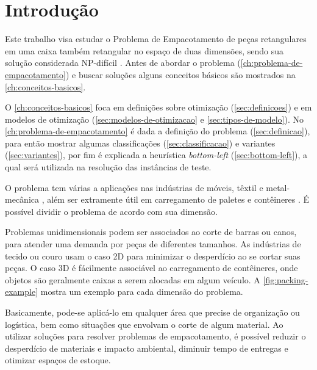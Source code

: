 \chapter*[Introdução]{Introdução}\label{ch:introducao}

Este trabalho visa estudar o Problema de Empacotamento de peças retangulares em uma caixa também retangular no espaço de duas dimensões, sendo sua solução considerada NP-difícil \cite{2DPackLib}.
Antes de abordar o problema (\autoref{ch:problema-de-empacotamento}) e buscar soluções alguns conceitos básicos são mostrados na \autoref{ch:conceitos-basicos}.

O \autoref{ch:conceitos-basicos} foca em definições sobre otimização (\autoref{sec:definicoes}) e em modelos de otimização (\autoref{sec:modelos-de-otimizacao} e \autoref{sec:tipos-de-modelo}).
No \autoref{ch:problema-de-empacotamento} é dada a definição do problema (\autoref{sec:definicao}), para então mostrar algumas classificações (\autoref{sec:classificacao}) e variantes (\autoref{sec:variantes}), por fim é explicada a heurística \textit{bottom-left} (\autoref{sec:bottom-left}), a qual será utilizada na resolução das instâncias de teste.

O problema tem várias a aplicações nas indústrias de móveis, têxtil e metal-mecânica \cite{queiroz2022estudo, cavali2004problemas, belluzzo2005otimizacao}, além ser extramente útil em carregamento de paletes e contêineres \cite{morabito1992abordagem}.
É possível dividir o problema de acordo com sua dimensão.

Problemas unidimensionais podem ser associados ao corte de barras ou canos, para atender uma demanda por peças de diferentes tamanhos.
As indústrias de tecido ou couro usam o caso 2D para minimizar o desperdício ao se cortar suas peças.
O caso 3D é fácilmente associável ao carregamento de contêineres, onde objetos são geralmente caixas a serem alocadas em algum veículo.
A \autoref{fig:packing-example} mostra um exemplo para cada dimensão do problema.



Basicamente, pode-se aplicá-lo em qualquer área que precise de organização ou logística, bem como situações que envolvam o corte de algum material.
Ao utilizar soluções para resolver problemas de empacotamento, é possível reduzir o desperdício de materiais e impacto ambiental, diminuir tempo de entregas e otimizar espaços de estoque.


